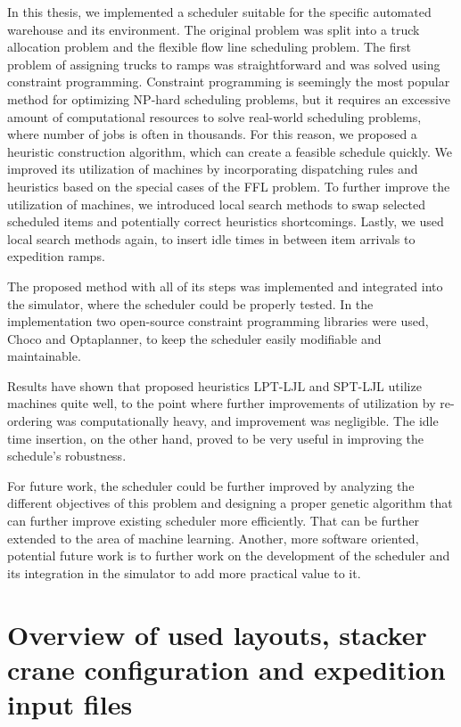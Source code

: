 \documentclass{ctuthesis}
\begin{document}
In this thesis, we implemented a scheduler suitable for the specific automated warehouse and its environment. 
The original problem was split into a truck allocation problem and the flexible flow line scheduling problem.
The first problem of assigning trucks to ramps was straightforward and was solved using constraint programming. Constraint programming is seemingly the most popular method for optimizing NP-hard scheduling problems, but it requires an excessive amount of computational resources to solve real-world scheduling problems, where number of jobs is often in thousands. For this reason, we proposed a heuristic construction algorithm, which can create a feasible schedule quickly. We improved its utilization of machines by incorporating dispatching rules and heuristics based on the special cases of the FFL problem.  To further improve the utilization of machines, we introduced local search methods to swap selected scheduled items and potentially correct heuristics shortcomings. Lastly, we used local search methods again, to insert idle times in between item arrivals to expedition ramps.

The proposed method with all of its steps was implemented and integrated into the simulator, where the scheduler could be properly tested. In the implementation two open-source constraint programming libraries were used, Choco and Optaplanner, to keep the scheduler easily modifiable and maintainable.

Results have shown that proposed heuristics LPT-LJL and SPT-LJL utilize machines quite well, to the point where further improvements of utilization by re-ordering was computationally heavy, and improvement was negligible. The idle time insertion, on the other hand, proved to be very useful in improving the schedule's robustness. 

For future work, the scheduler could be further improved by analyzing the different objectives of this problem and designing a proper genetic algorithm that can further improve existing scheduler more efficiently. That can be further extended to the area of machine learning. Another, more software oriented, potential future work is to further work on the development of the scheduler and its integration in the simulator to add more practical value to it.






\appendix

\chapter{Overview of used layouts, stacker crane configuration and expedition input files}
\end{document}
